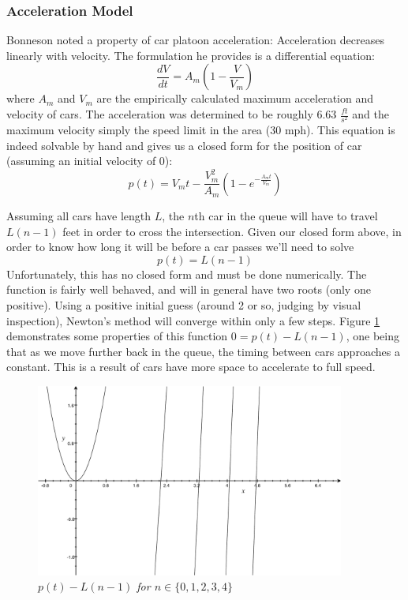 \documentclass[a4paper,12pt]{article}
\begin{document}
\subsubsection{Acceleration Model}
Bonneson \cite{bonneson} noted a property of car platoon acceleration: Acceleration decreases linearly with velocity.
The formulation he provides is a differential equation:
\[
\frac{dV}{dt} = A_{m} \left( 1 - \frac{V}{V_{m}} \right)
\]
where $A_m$ and $V_m$ are the empirically calculated maximum acceleration and velocity of cars. The acceleration was
determined to be roughly 6.63 $\frac{ft}{s^2}$ and the maximum velocity simply the speed limit in the area (30 mph).
This equation is indeed solvable by hand and gives us a closed form for the position of car (assuming an initial velocity of 0):
\[
    p(t) = V_{m}t - \frac{V_{m}^2}{A_{m}} \left( 1 - e^{-\frac{A_{m}t}{V_{m}} } \right)
\]

Assuming all cars have length $L$, the $n$th car in the queue will have to travel $L(n-1)$ feet in order to cross the
intersection. Given our closed form above, in order to know how long it will be before a car passes we'll need to solve
\[
p(t) = L(n-1)
\]
Unfortunately, this has no closed form and must be done numerically. The function is fairly well behaved, and will in general have two roots
(only one positive). Using a positive initial guess (around 2 or so, judging by visual inspection), Newton's method
will converge within only a few steps. Figure \ref{fig:acceleration} demonstrates some properties of this function
$0 = p(t) - L(n-1)$, one being
that as we move further back in the queue, the timing between cars approaches a constant. This is a result of cars
have more space to accelerate to full speed.

\begin{figure}
\begin{center}  
\includegraphics[width=4in]{../acceleration.pdf}  
\caption{\small \sl $p(t) - L(n-1)$ for $n \in \{0, 1, 2, 3, 4\}$ \label{fig:acceleration}}  
\end{center}  
\end{figure} 
\end{document}
